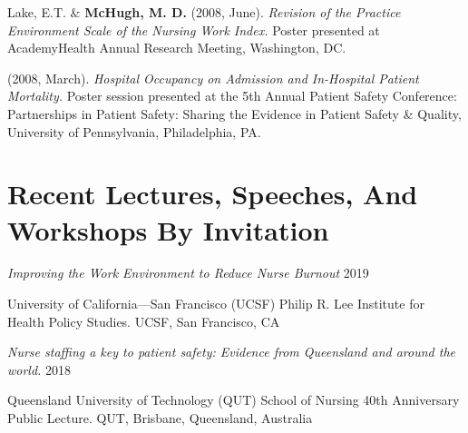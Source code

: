 \documentclass[10pt,]{article}
\begin{document}
{{{{{{{{{{{{{{{\begin{hangparas}{.25in}{1}
\end{hangparas}

\vspace{4mm}

\begin{hangparas}{.25in}{1}

\*Lake, E.T. \& {\textbf {McHugh, M. D.}} (2008, June). {\textit {Revision of the Practice Environment Scale of the Nursing Work Index.}} Poster presented at AcademyHealth Annual Research Meeting, Washington, DC.

\end{hangparas}

\vspace{4mm}

\begin{hangparas}{.25in}{1}

 (2008, March). {\textit {Hospital Occupancy on Admission and In-Hospital Patient Mortality.}} Poster session presented at the 5th Annual Patient Safety Conference: Partnerships in Patient Safety: Sharing the Evidence in Patient Safety \& Quality, University of Pennsylvania, Philadelphia, PA.

\end{hangparas}

\vspace{4mm}

\section{\Large \sc Recent Lectures, Speeches, And Workshops By Invitation}

\begin{hangparas}{.5in}{1}

{\textit {Improving the Work Environment to Reduce Nurse Burnout}} \hfill 2019 
\vspace{-2.5mm}
\begin{adjustwidth}{0.5cm}{1cm}
University of California—San Francisco (UCSF) Philip R. Lee Institute for Health Policy Studies. UCSF, San Francisco, CA
\end{adjustwidth}

{\textit {Nurse staffing a key to patient safety: Evidence from Queensland and around the world.}} \hfill 2018 
\vspace{-2.5mm}
\begin{adjustwidth}{0.5cm}{1cm}
Queensland University of Technology (QUT) School of Nursing 40th Anniversary Public Lecture. QUT, Brisbane, Queensland, Australia
\end{adjustwidth}


\end{hangparas}}}}}}}}}}}}}}}}
\end{document}
